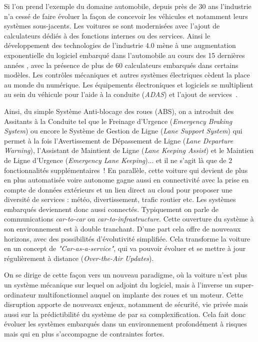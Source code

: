 \documentclass[french, a4paper, 11pt, twoside, pdftex]{StyleThese}
\begin{document}
		Si l'on prend l'exemple du domaine automobile, depuis près de 30 ans l'industrie n'a cessé de faire évoluer la façon de concevoir les véhicules et notamment leurs systèmes sous-jacents. Les voitures se sont modernisées avec l'ajout de calculateurs dédiés à des fonctions internes ou des services. Ainsi le développement des technologies de l'industrie 4.0 mène à une augmentation exponentielle du logiciel embarqué dans l'automobile au cours des 15 dernières années \cite{blanchet_industrie_2016}, avec la présence de plus de 60 calculateurs embarqués dans certains modèles. Les contrôles mécaniques et autres systèmes électriques cèdent la place au monde du numérique. Les équipements électroniques et logiciels se multiplient au sein du véhicule pour l’aide à la conduite (\textit{ADAS}) et l’ajout de services~\cite{schmidt_automotive_2010}.
		
		Ainsi, du simple Système Anti-blocage des roues (ABS), on a introduit des Assitants à la Conduite tel que le Freinage d'Urgence (\textit{Emergency Braking System}) ou encore le Système de Gestion de Ligne (\textit{Lane Support System}) qui permet à la fois l'Avertissement de Dépassement de Ligne (\textit{Lane Departure Warning}), l'Assistant de Maintient de Ligne (\textit{Lane Keeping Assist}) et le Maintien de Ligne d'Urgence (\textit{Emergency Lane Keeping})... et il ne s'agit là que de 2 fonctionnalités supplémentaires~! En parallèle, cette voiture qui devient de plus en plus automatisée voire autonome gagne aussi en connectivité avec la prise en compte de données extérieurs et un lien direct au cloud pour proposer une diversité de services : météo, divertissement, trafic routier etc.
		Les systèmes embarqués deviennent donc aussi connectés. Typiquement on parle de communications \emph{car-to-car} ou \emph{car-to-infrastructure}. Cette ouverture du système à son environnement est à double tranchant. D'une part cela offre de nouveaux horizons, avec des possibilités d'évolutivité simplifiée. Cela transforme la voiture en un concept de \textit{"Car-as-a-service"}, qui va pouvoir évoluer et se mettre à jour régulièrement à distance (\textit{Over-the-Air Updates}).
		
		On se dirige de cette façon vers un nouveau paradigme, où la voiture n'est plus un système mécanique sur lequel on adjoint du logiciel, mais à l'inverse un super-ordinateur multifonctionnel auquel on implante des roues et un moteur. Cette disruption apporte de nouveaux enjeux, notamment de sécurité, vie privée mais aussi sur la prédictibilité du système de par sa complexification. Cela fait donc évoluer les systèmes embarqués dans un environnement profondément à risques mais qui en plus s'accompagne de contraintes fortes.
		
\end{document}
